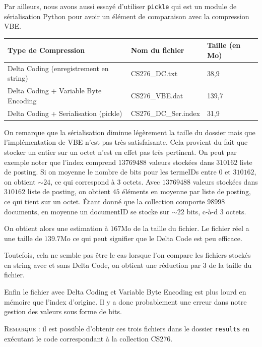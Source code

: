 \documentclass[12pt,a4paper]{article}
\begin{document}
Par ailleurs, nous avons aussi essayé d'utiliser \texttt{pickle} qui est un module de sérialisation Python pour avoir un élément de comparaison avec la compression VBE.

\begin{table}[h]
\centering
\begin{tabular}{|l|l|l|}
\hline
Type de Compression                                   & Nom du fichier       & Taille (en Mo) \\ \hline
Delta Coding (enregistrement en string) & CS276\_DC.txt        & 38,9           \\ \hline
Delta Coding + Variable Byte Encoding                 & CS276\_VBE.dat       & 139,7          \\ \hline
Delta Coding + Serialisation (pickle)                 & CS276\_DC\_Ser.index & 31,9           \\ \hline
\end{tabular}
\end{table}

On remarque que la sérialisation diminue légèrement la taille du dossier mais que l'implé\-mentation de VBE n'est pas très satisfaisante. Cela provient du fait que stocker un entier sur un octet n'est en effet pas très pertinent. On peut par exemple noter que l'index comprend $13769488$ valeurs stockées dans $310162$ liste de posting. Si on moyenne le nombre de bits pour les termeIDs entre $0$ et $310162$, on obtient $\sim24$, ce qui correspond à $3$ octets. Avec $13769488$ valeurs stockées dans $310162$ liste de posting, on obtient $45$ éléments en moyenne par liste de posting, ce qui tient sur un octet. Étant donné que la collection comporte $98998$ documents, en moyenne un documentID se stocke sur $\sim22$ bits, c-à-d $3$ octets.

On obtient alors une estimation à $167$Mo de la taille du fichier. Le fichier réel a une taille de $139.7$Mo ce qui peut signifier que le Delta Code est peu efficace.

Toutefois, cela ne semble pas être le cas lorsque l'on compare les fichiers stockés en string avec et sans Delta Code, on obtient une réduction par $3$ de la taille du fichier.

Enfin le fichier avec Delta Coding et Variable Byte Encoding est plus lourd en mémoire que l'index d'origine. Il y a donc probablement une erreur dans notre gestion des valeurs sous forme de bits.

\noindent \textsc{Remarque} : il est possible d'obtenir ces trois fichiers dans le dossier \texttt{results} en exécutant le code correspondant à la collection CS276.
\end{document}

